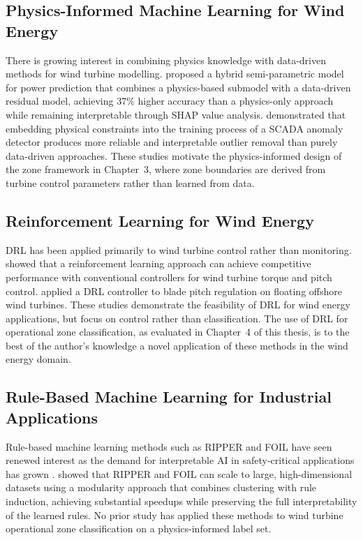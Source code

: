\subsection*{Physics-Informed Machine Learning for Wind Energy}

There is growing interest in combining physics knowledge with data-driven methods for
wind turbine modelling. \citet{gijon2025} proposed a hybrid semi-parametric model for
power prediction that combines a physics-based submodel with a data-driven residual
model, achieving 37\% higher accuracy than a physics-only approach while remaining
interpretable through SHAP value analysis. \citet{hong2025} demonstrated that embedding
physical constraints into the training process of a SCADA anomaly detector produces
more reliable and interpretable outlier removal than purely data-driven approaches.
These studies motivate the physics-informed design of the zone framework in Chapter~3,
where zone boundaries are derived from turbine control parameters rather than learned
from data.

\subsection*{Reinforcement Learning for Wind Energy}

DRL has been applied primarily to wind turbine control rather than monitoring.
\citet{xie2023} showed that a reinforcement learning approach can achieve competitive
performance with conventional controllers for wind turbine torque and pitch control.
\citet{didier2022} applied a DRL controller to blade pitch regulation on floating
offshore wind turbines. These studies demonstrate the feasibility of DRL for wind energy
applications, but focus on control rather than classification. The use of DRL for
operational zone classification, as evaluated in Chapter~4 of this thesis, is to the
best of the author's knowledge a novel application of these methods in the wind energy
domain.

\subsection*{Rule-Based Machine Learning for Industrial Applications}

Rule-based machine learning methods such as RIPPER and FOIL have seen renewed interest
as the demand for interpretable AI in safety-critical applications has grown
\citep{nossig2024}. \citet{nossig2024} showed that RIPPER and FOIL can scale to large,
high-dimensional datasets using a modularity approach that combines clustering with
rule induction, achieving substantial speedups while preserving the full interpretability
of the learned rules. No prior study has applied these methods to wind turbine
operational zone classification on a physics-informed label set.

